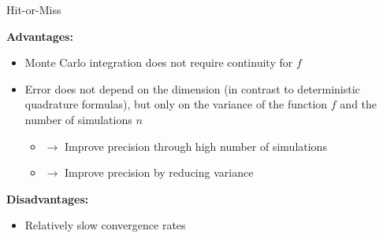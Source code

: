 \documentclass[11pt,compress,t,notes=noshow, xcolor=table]{beamer}
\begin{document}
\begin{vbframe}{Hit-or-Miss}
%
%
%
%
%
%
%
%
%
%
%
%
%
%
%
%
%

\framebreak

\textbf{Advantages:}
\begin{itemize}
\item Monte Carlo integration does not require continuity for $f$
\item Error does not depend on the dimension (in contrast to deterministic quadrature formulas), but only on the variance of the function $f$ and the number of simulations $n$
\begin{itemize}
\item $\to$ Improve precision through high number of simulations
\item $\to$ Improve precision by reducing variance
\end{itemize}
\end{itemize}

\textbf{Disadvantages:}
\begin{itemize}
\item Relatively slow convergence rates
\end{itemize}



\end{vbframe}
\end{document}
